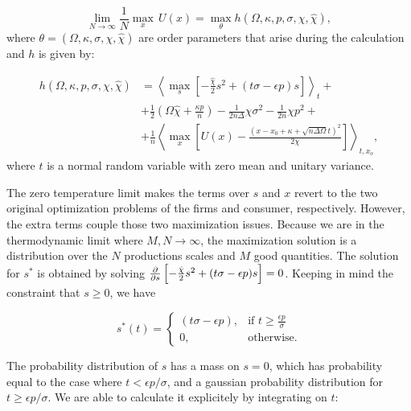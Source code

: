 \begin{equation}
  \label{eq:52}
  \lim_{N\to \infty} \frac{1}{N} \max_x \, U(x) = \max_\theta h(\Omega, \kappa,
  p, \sigma, \chi, \hat{\chi}),
\end{equation}
where $\theta = (\Omega, \kappa,
  \sigma, \chi, \hat{\chi})$ are order parameters that arise during
  the calculation and $h$ is given by:

\begin{align}
  \label{eq:h}
  h(\Omega, \kappa, p, \sigma, \chi, \hat{\chi})& = \left\langle
    \max_s \left[-\frac{\hat{\chi}}{2}s^2 + (t \sigma - \epsilon p)
                                                  s\right]
                                                  \right\rangle_t +
                                                  \nonumber\\ & +
  \frac{1}{2} \left(\Omega \hat{\chi} + \frac{\kappa p}{n}\right) -
  \frac{1}{2n\Delta} \chi \sigma^2 - \frac{1}{2n} \chi p^2 + \nonumber\\ &+
  \frac{1}{n} \left\langle \max_x \left[U(x) - \frac{(x - x_0 + \kappa +
      \sqrt{n\Delta\Omega}t)^2}{2\chi}\right] \right\rangle_{t,x_o},
\end{align}
where $t$ is a normal random variable with zero mean and unitary variance.

The zero temperature limit makes the terms over $s$ and $x$ revert to the two original optimization problems of the firms and consumer, respectively. However, the extra terms couple those two maximization issues. Because we are in the thermodynamic limit where $M, N \to \infty$, the maximization solution is a distribution over the $N$ productions scales and $M$ good quantities. The solution for $s^*$ is obtained by solving  $\frac{\partial}{\partial s}
\left[-\frac{\hat{\chi}}{2}s^2 + (t \sigma - \epsilon p) s\right] =
0$. Keeping in mind the constraint that $s\geq 0$, we have

\begin{equation}
  \label{eq:s_ast}
  s^*(t) =
  \begin{cases}
    (t\sigma - \epsilon p), & \text{if } t \geq \frac{\epsilon
      p}{\sigma} \\
    0, & \text{otherwise.}
  \end{cases}
\end{equation}

The probability distribution of $s$ has a mass on $s=0$, which has probability equal to the case where $t < \epsilon p / \sigma$, and a gaussian probability distribution for $t \geq \epsilon p /
\sigma$. We are able to calculate it explicitely by integrating on $t$:

